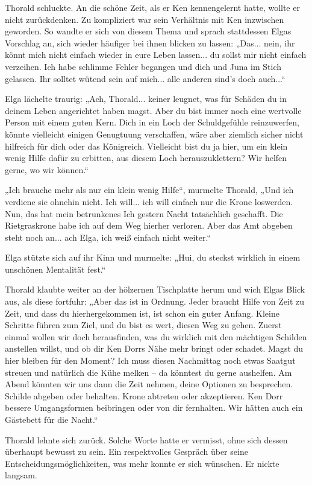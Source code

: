 Thorald schluckte. An die schöne Zeit, als er Ken kennengelernt hatte, wollte er nicht zurückdenken. Zu kompliziert war sein Verhältnis mit Ken inzwischen geworden. So wandte er sich von diesem Thema und sprach stattdessen Elgas Vorschlag an, sich wieder häufiger bei ihnen blicken zu lassen: „Das... nein, ihr könnt mich nicht einfach wieder in eure Leben lassen... du sollst mir nicht einfach verzeihen. Ich habe schlimme Fehler begangen und dich und Juna im Stich gelassen. Ihr solltet wütend sein auf mich... alle anderen sind’s doch auch...“

Elga lächelte traurig: „Ach, Thorald... keiner leugnet, was für Schäden du in deinem Leben angerichtet haben magst. Aber du bist immer noch eine wertvolle Person mit einem guten Kern. Dich in ein Loch der Schuldgefühle reinzuwerfen, könnte vielleicht einigen Genugtuung verschaffen, wäre aber ziemlich sicher nicht hilfreich für dich oder das Königreich. Vielleicht bist du ja hier, um ein klein wenig Hilfe dafür zu erbitten, aus diesem Loch herauszuklettern? Wir helfen gerne, wo wir können.“

„Ich brauche mehr als nur ein klein wenig Hilfe“, murmelte Thorald, „Und ich verdiene sie ohnehin nicht. Ich will... ich will einfach nur die Krone loswerden. Nun, das hat mein betrunkenes Ich gestern Nacht tatsächlich geschafft. Die Rietgraskrone habe ich auf dem Weg hierher verloren. Aber das Amt abgeben steht noch an... ach Elga, ich weiß einfach nicht weiter.“

Elga stützte sich auf ihr Kinn und murmelte: „Hui, du steckst wirklich in einem unschönen Mentalität fest.“

Thorald klaubte weiter an der hölzernen Tischplatte herum und wich Elgas Blick aus, als diese fortfuhr: „Aber das ist in Ordnung. Jeder braucht Hilfe von Zeit zu Zeit, und dass du hierhergekommen ist, ist schon ein guter Anfang. Kleine Schritte führen zum Ziel, und du bist es wert, diesen Weg zu gehen. Zuerst einmal wollen wir doch herausfinden, was du wirklich mit den mächtigen Schilden anstellen willst, und ob dir Ken Dorrs Nähe mehr bringt oder schadet. Magst du hier bleiben für den Moment? Ich muss diesen Nachmittag noch etwas Saatgut streuen und natürlich die Kühe melken – da könntest du gerne aushelfen. Am Abend könnten wir uns dann die Zeit nehmen, deine Optionen zu besprechen. Schilde abgeben oder behalten. Krone abtreten oder akzeptieren. Ken Dorr bessere Umgangsformen beibringen oder von dir fernhalten. Wir hätten auch ein Gästebett für die Nacht.“

Thorald lehnte sich zurück. Solche Worte hatte er vermisst, ohne sich dessen überhaupt bewusst zu sein. Ein respektvolles Gespräch über seine Entscheidungsmöglichkeiten, was mehr konnte er sich wünschen. Er nickte langsam.


